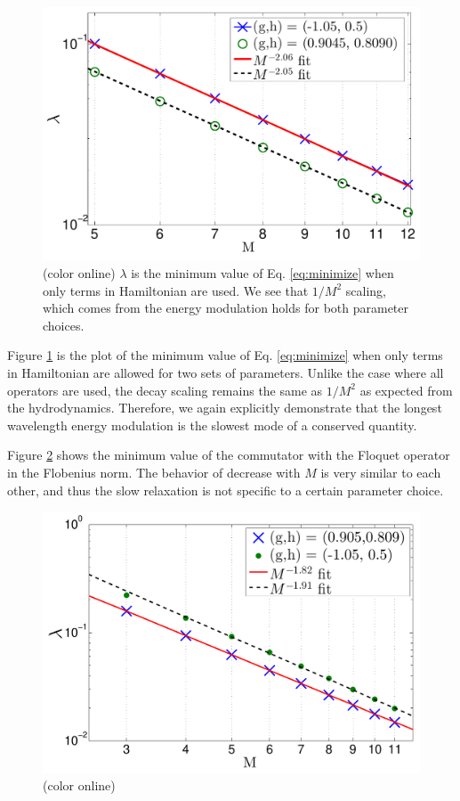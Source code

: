 \documentclass[twocolumn,superscriptaddress, prb]{revtex4-1}
\begin{document}
\begin{figure}
\includegraphics[width=1.0\linewidth]{X_Z_ZZ_only_two_parameters.pdf}
\centering
\caption{(color online) $\lambda$ is the minimum value of Eq. \eqref{eq:minimize} when only terms in Hamiltonian are used. We see that $1/M^2$ scaling, which comes from the energy modulation holds for both parameter choices. }
\label{fig:Ham_only_two_parameters}
\end{figure}
Figure \ref{fig:Ham_only_two_parameters} is the plot of the minimum value of Eq. \eqref{eq:minimize} when only terms in Hamiltonian are allowed
for two sets of parameters. Unlike the case where all operators are used,
the decay scaling remains the same as $1/M^2$ as expected from the hydrodynamics.
Therefore, we again explicitly demonstrate that the longest wavelength energy modulation is the slowest mode of a conserved quantity.



Figure \ref{fig:floquet_two_parameters} shows the minimum value of the commutator with the Floquet operator in the Flobenius norm.
The behavior of decrease with $M$ is very similar to each other, 
and thus the slow relaxation is not specific to a certain parameter choice. 

\begin{figure}
\includegraphics[width=1.0\linewidth]{semi_infinite_floquet_two_parameters_extended.pdf}
\centering
\caption{(color online) }
\label{fig:floquet_two_parameters}
\end{figure}
\end{document}
